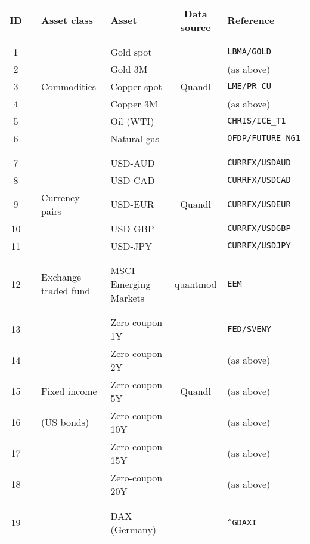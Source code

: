 \documentclass{article}
\begin{document}
\begin{table}\
\centering
\begin{tabular}{clllcl}
\textbf{ID} &  & \textbf{Asset class} & \textbf{Asset} & \textbf{Data source} & \textbf{Reference}\\
 &  &  &  &  & \\
\hline
 &  &  &  &  & \\
1 &  &  & Gold spot &  & \texttt{LBMA/GOLD}\\
2 &  &  & Gold 3M &  & (as above)\\
3 &  & Commodities & Copper spot & Quandl & \texttt{LME/PR\_CU}\\
4 &  &  & Copper 3M &  & (as above)\\
5 &  &  & Oil (WTI) &  & \texttt{CHRIS/ICE\_T1}\\
6 &  &  & Natural gas &  & \texttt{OFDP/FUTURE\_NG1}\\
 &  &  &  &  & \\
\hline
 &  &  &  &  & \\
7 &  &  & USD-AUD &  & \texttt{CURRFX/USDAUD}\\
8 &  &  & USD-CAD &  & \texttt{CURRFX/USDCAD}\\
9 &  & Currency pairs & USD-EUR & Quandl & \texttt{CURRFX/USDEUR}\\
10 &  &  & USD-GBP &  & \texttt{CURRFX/USDGBP}\\
11 &  &  & USD-JPY &  & \texttt{CURRFX/USDJPY}\\
 &  &  &  &  & \\
\hline
 &  &  &  &  & \\
12 &  & Exchange traded fund & MSCI Emerging Markets & quantmod & \texttt{EEM}\\
 &  &  &  &  & \\
\hline
 &  &  &  &  & \\
13 &  &  & Zero-coupon 1Y &  & \texttt{FED/SVENY}\\
14 &  &  & Zero-coupon 2Y &  & (as above)\\
15 &  & Fixed income & Zero-coupon 5Y & Quandl & (as above)\\
16 &  & (US bonds) & Zero-coupon 10Y &  & (as above)\\
17 &  &  & Zero-coupon 15Y &  & (as above)\\
18 &  &  & Zero-coupon 20Y &  & (as above)\\
 &  &  &  &  & \\
\hline
 &  &  &  &  & \\
19 &  &  & DAX          (Germany) &  & \texttt{\textasciicircum{}GDAXI}\\

\end{tabular}
\end{table}
\end{document}
